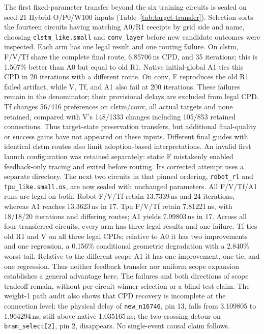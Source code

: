 \documentclass[conference,10pt]{IEEEtran}
\begin{document}
The first fixed-parameter transfer beyond the six training circuits is sealed on seed-21 Hybrid-O/P0/W100 inputs (Table~\ref{tab:target-transfer}). Selection sorts the fourteen circuits having matching A0/R1 receipts by grid side and name, choosing \texttt{clstm\_like.small} and \texttt{conv\_layer} before new candidate outcomes were inspected. Each arm has one legal result and one routing failure. On clstm, F/V/Tf share the complete final route, 6.85706\,ns CPD, and 35 iterations; this is 1.507\% better than A0 but equal to old R1. Native initial-global A1 ties this CPD in 20 iterations with a different route. On conv, F reproduces the old R1 failed artifact, while V, Tf, and A1 also fail at 200 iterations. These failures remain in the denominator; their provisional delays are excluded from legal CPD. Tf changes 56/416 preferences on clstm/conv, all actual targets and none retained, compared with V's 148/1333 changes including 105/853 retained connections. Thus target-state preservation transfers, but additional final-quality or success gains have not appeared on these inputs. Different final guides with identical clstm routes also limit adoption-based interpretations. An invalid first launch configuration was retained separately: static F mistakenly enabled feedback-only tracing and exited before routing. Its corrected attempt uses a separate directory. The next two circuits in that pinned ordering, \texttt{robot\_rl} and \texttt{tpu\_like.small.os}, are now sealed with unchanged parameters. All F/V/Tf/A1 runs are legal on both. Robot F/V/Tf retain 13.7339\,ns and 24 iterations, whereas A1 reaches 13.3623\,ns in 17. Tpu F/V/Tf retain 7.81221\,ns, with 18/18/20 iterations and differing routes; A1 yields 7.99803\,ns in 17. Across all four transferred circuits, every arm has three legal results and one failure. Tf ties old R1 and V on all three legal CPDs; relative to A0 it has two improvements and one regression, a 0.156\% conditional geometric degradation with a 2.840\% worst tail. Relative to the different-scope A1 it has one improvement, one tie, and one regression. Thus neither feedback transfer nor uniform scope expansion establishes a general advantage here. The failures and both directions of scope tradeoff remain, without per-circuit winner selection or a blind-test claim. The weight-1 path audit also shows that CPD recovery is incomplete at the connection level: the physical delay of \texttt{new\_n16746}, pin 13, falls from 3.109805 to 1.964294\,ns, still above native 1.035165\,ns; the two-crossing detour on \texttt{bram\_select[2]}, pin 2, disappears. No single-event causal claim follows.
\end{document}
